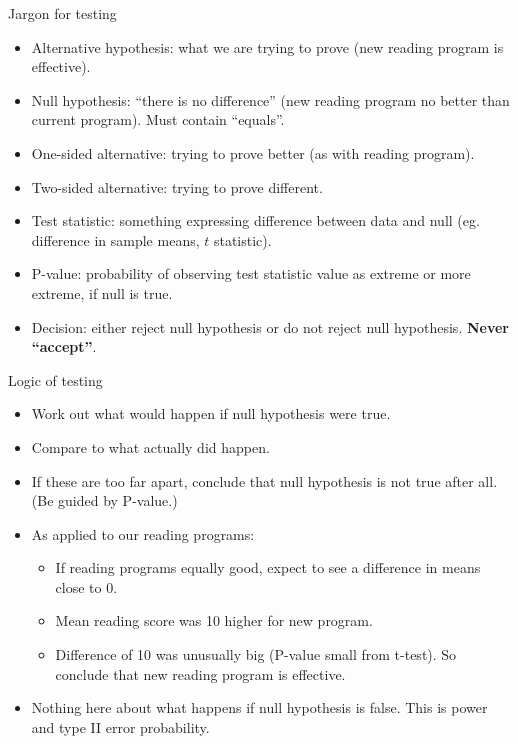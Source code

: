 \documentclass[ignorenonframetext,]{beamer}
\providecommand{\tightlist}{%
  \setlength{\itemsep}{0pt}\setlength{\parskip}{0pt}}
\begin{document}
\begin{frame}{Jargon for testing}
\protect\hypertarget{jargon-for-testing}{}

\begin{itemize}
\tightlist
\item
  Alternative hypothesis: what we are trying to prove (new reading
  program is effective).
\item
  Null hypothesis: ``there is no difference'' (new reading program no
  better than current program). Must contain ``equals''.
\item
  One-sided alternative: trying to prove better (as with reading
  program).
\item
  Two-sided alternative: trying to prove different.
\item
  Test statistic: something expressing difference between data and null
  (eg. difference in sample means, \(t\) statistic).
\item
  P-value: probability of observing test statistic value as extreme or
  more extreme, if null is true.
\item
  Decision: either reject null hypothesis or do not reject null
  hypothesis. \textbf{Never ``accept''}.
\end{itemize}

\end{frame}

\begin{frame}{Logic of testing}
\protect\hypertarget{logic-of-testing}{}

\begin{itemize}
\tightlist
\item
  Work out what would happen if null hypothesis were true.
\item
  Compare to what actually did happen.
\item
  If these are too far apart, conclude that null hypothesis is not true
  after all. (Be guided by P-value.)
\item
  As applied to our reading programs:

  \begin{itemize}
  \tightlist
  \item
    If reading programs equally good, expect to see a difference in
    means close to 0.
  \item
    Mean reading score was 10 higher for new program.
  \item
    Difference of 10 was unusually big (P-value small from t-test). So
    conclude that new reading program is effective.
  \end{itemize}
\item
  Nothing here about what happens if null hypothesis is false. This is
  power and type II error probability.
\end{itemize}

\end{frame}
\end{document}
